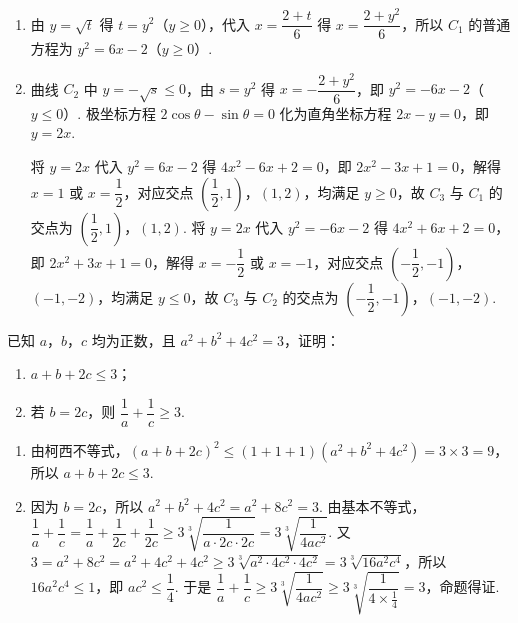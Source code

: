\begin{solution}
\begin{enumerate}
\item 由 \(y=\sqrt t\) 得 \(t=y^2\)（\(y\ge0\)），代入 \(x=\dfrac{2+t}6\) 得 \(x=\dfrac{2+y^2}6\)，所以 \(C_1\) 的普通方程为 \(y^2=6x-2\)（\(y\ge0\)）.

\item 曲线 \(C_2\) 中 \(y=-\sqrt s\le0\)，由 \(s=y^2\) 得 \(x=-\dfrac{2+y^2}6\)，即 \(y^2=-6x-2\)（\(y\le0\)）. 极坐标方程 \(2\cos\theta-\sin\theta=0\) 化为直角坐标方程 \(2x-y=0\)，即 \(y=2x\).

将 \(y=2x\) 代入 \(y^2=6x-2\) 得 \(4x^2-6x+2=0\)，即 \(2x^2-3x+1=0\)，解得 \(x=1\) 或 \(x=\dfrac12\)，对应交点 \(\left(\dfrac12,1\right)\)，\((1,2)\)，均满足 \(y\ge0\)，故 \(C_3\) 与 \(C_1\) 的交点为 \(\left(\dfrac12,1\right)\)，\((1,2)\). 将 \(y=2x\) 代入 \(y^2=-6x-2\) 得 \(4x^2+6x+2=0\)，即 \(2x^2+3x+1=0\)，解得 \(x=-\dfrac12\) 或 \(x=-1\)，对应交点 \(\left(-\dfrac12,-1\right)\)，\((-1,-2)\)，均满足 \(y\le0\)，故 \(C_3\) 与 \(C_2\) 的交点为 \(\left(-\dfrac12,-1\right)\)，\((-1,-2)\).
\end{enumerate}
\end{solution}

\begin{problem}
已知 \(a\)，\(b\)，\(c\) 均为正数，且 \(a^2+b^2+4c^2=3\)，证明：

\begin{enumerate}
\item \(a+b+2c\le3\)；
\item 若 \(b=2c\)，则 \(\dfrac{1}{a}+\dfrac{1}{c}\ge3\).
\end{enumerate}
\end{problem}

\begin{solution}
\begin{enumerate}
\item 由柯西不等式，\((a+b+2c)^2\le(1+1+1)(a^2+b^2+4c^2)=3\times3=9\)，所以 \(a+b+2c\le3\).

\item 因为 \(b=2c\)，所以 \(a^2+b^2+4c^2=a^2+8c^2=3\). 由基本不等式，
\(\dfrac1a+\dfrac1c=\dfrac1a+\dfrac1{2c}+\dfrac1{2c}\ge3\sqrt[3]{\dfrac1{a\cdot2c\cdot2c}}=3\sqrt[3]{\dfrac1{4ac^2}}\).
又 \(3=a^2+8c^2=a^2+4c^2+4c^2\ge3\sqrt[3]{a^2\cdot4c^2\cdot4c^2}=3\sqrt[3]{16a^2c^4}\)，所以 \(16a^2c^4\le1\)，即 \(ac^2\le\dfrac14\). 于是 \(\dfrac1a+\dfrac1c\ge3\sqrt[3]{\dfrac1{4ac^2}}\ge3\sqrt[3]{\dfrac1{4\times\frac14}}=3\)，命题得证.
\end{enumerate}
\end{solution}
